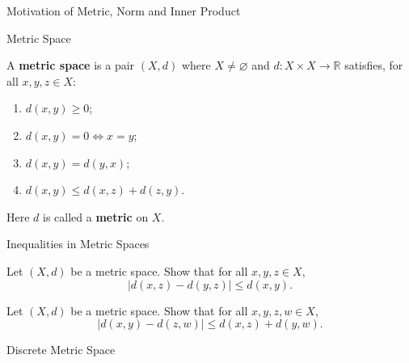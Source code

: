 \documentclass[12pt, a4paper]{article}
\begin{document}
\FrontPage
\Large

\begin{heading}
    Motivation of Metric, Norm and Inner Product
\end{heading}

\clearpage

\begin{heading}
    Metric Space
\end{heading}

\vspace{10pt}

\begin{definition}
    A \textbf{metric space} is a pair $(X,d)$ where $X\neq\varnothing$ and
    $d:X\times X\to\mathbb{R}$ satisfies, for all $x,y,z\in X$:
    \begin{enumerate}[label=(M\arabic*)]
    \item $d(x,y)\ge 0$;
    \item $d(x,y)=0 \iff x=y$;
    \item $d(x,y)=d(y,x)$;
    \item $d(x,y)\le d(x,z)+d(z,y)$.
    \end{enumerate}
    Here $d$ is called a \textbf{metric} on $X$.
\end{definition}

\clearpage

\begin{heading}
    Inequalities in Metric Spaces
\end{heading}

\vspace{10pt}

\begin{theorem}
    Let $(X,d)$ be a metric space. Show that for all $x,y,z\in X$,
    \[
        |d(x,z)-d(y,z)|\le d(x,y).
    \]
\end{theorem}

\clearpage

\begin{theorem}
    Let $(X,d)$ be a metric space. Show that for all $x,y,z,w\in X$,
    \[
        |d(x,y)-d(z,w)|\le d(x,z)+d(y,w).
    \]
\end{theorem}

\clearpage

\begin{heading}
    Discrete Metric Space
\end{heading}

\vspace{10pt}
\end{document}
